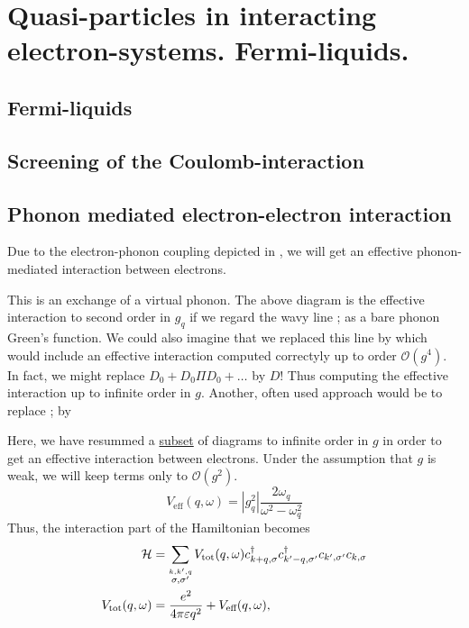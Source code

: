 \section{Quasi-particles in interacting electron-systems. Fermi-liquids.}

\subsection{Fermi-liquids}

\subsection{Screening of the Coulomb-interaction}

\subsection{Phonon mediated electron-electron interaction}

Due to the electron-phonon coupling depicted in , we will get an effective phonon-mediated interaction between electrons.

%		
%


This is an exchange of a virtual phonon. The above diagram is the effective interaction to second order in $g_q$ if we regard the wavy line ; as a bare phonon Green's function. We could also imagine that we replaced this line by 
which would include an effective interaction computed correctyly up to order $\mathcal{O}(g^4)$. In fact, we might replace $D_0 + D_0\Pi D_0 +\dots$ by $D!$ Thus computing the effective interaction up to infinite order in $g$. Another, often used approach would be to replace ; by  

Here, we have resummed a \underline{subset} of diagrams to infinite order in $g$ in order to get an effective interaction between electrons. Under the assumption that $g$ is weak, we will keep terms only to $\mathcal{O}(g^2)$.
\begin{equation}
V_{\text{eff}}(q, \omega) = |g_q^2|\frac{2\omega_q}{\omega^2-\omega_q^2}
\end{equation}
Thus, the interaction part of the Hamiltonian becomes 
\begin{align}
\mathcal{H} &= \sum_{\stackrel{k,k',q}{\sigma,\sigma'}}V_{\text{tot}}(q, \omega)c_{k+q, \sigma}^\dagger c_{k'-q, \sigma'}^\dagger c_{k', \sigma'}c_{k,\sigma} \\
V_{\text{tot}}(q, \omega) &= \frac{e^2}{4\pi\varepsilon q^2} + V_{\text{eff}}(q, \omega),
\end{align}

